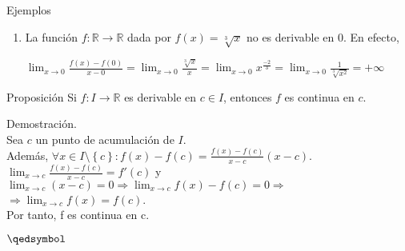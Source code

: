 \documentclass{beamer}
\newcounter{saveenumi}
\newcommand{\conti}{\setcounter{enumi}{\value{saveenumi}}}
\begin{document}
\begin{frame}
\begin{exampleblock}{Ejemplos}
\begin{enumerate}
\conti
\item La función $f:\mathbb{R}\rightarrow\mathbb{R}$ dada por $f(x) = \sqrt[3]{x}$ no es derivable en 0.
En efecto,
\begin{center}
$\displaystyle\lim_{x \to 0}\frac{f(x)-f(0)}{x-0} = \displaystyle\lim_{x \to 0}\frac{\sqrt[3]{x}}{x} =
\displaystyle\lim_{x \to 0} x^{\frac{-2}{3}} =
\displaystyle\lim_{x \to 0}\frac{1}{\sqrt[3]{x^{2}}} = +\infty$
\end{center}
\end{enumerate}
\end{exampleblock}

\begin{block}{Proposición}
Si $f:I\rightarrow\mathbb{R}$ es derivable en $c\in{I}$, entonces $f$ es continua en $c$.
\end{block}
Demostración.\\
Sea $c$ un punto de acumulación de $I$.\\
Además, $\forall{x}\in{I\setminus{\left\{c\right\}}}: f(x) - f(c) = \frac{f(x)-f(c)}{x-c}(x-c)$.\\
$\displaystyle\lim_{x \to c}\frac{f(x)-f(c)}{x-c} = f'(c)$ y $\displaystyle\lim_{x \to c}(x-c) = 0\Rightarrow\displaystyle\lim_{x \to c}f(x)-f(c) = 0\Rightarrow$\\$\Rightarrow\displaystyle\lim_{x \to c}f(x)=f(c)$.\\
Por tanto, f es continua en c.
\begin{flushright}
$\qedsymbol$
\end{flushright}
\end{frame}
\end{document}
